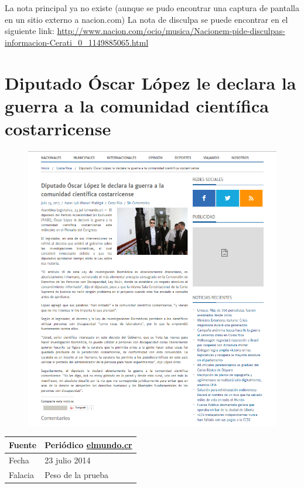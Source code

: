 \documentclass[times]{simauth}
\begin{document}
La nota principal ya no existe (aunque se pudo encontrar una captura de pantalla en un sitio externo a nacion.com) 
La nota de disculpa se puede encontrar en el siguiente link: 
\href{http://www.nacion.com/ocio/musica/Nacionem-pide-disculpas-informacion-Cerati_0_1149885065.html}{http://www.nacion.com/ocio/musica/Nacionem-pide-disculpas-informacion-Cerati\_0\_1149885065.html}

\newpage
\section{Diputado Óscar López le declara la guerra a la comunidad científica costarricense}

\begin{figure}[h!]
    \centering
    \includegraphics[width=14cm]{OscarLopez}
    \label{fig:falacia11}
\end{figure}

\newpage
\begin{table}[h!]
    \begin{tabular}{ll} 
        \toprule[1.5pt]
        Fuente & Periódico \href{http://www.elmundo.cr}{elmundo.cr}\\
        \midrule[0.5pt]
        Fecha  & 23 julio 2014\\
        \midrule[0.5pt]
        Falacia & Peso de la prueba\\
        \bottomrule[1.5pt]
    \end{tabular} 
\end{table}
\end{document}

